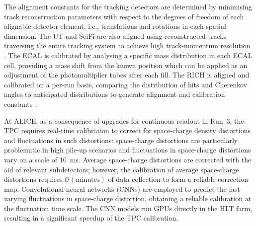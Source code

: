 The alignment constants for the tracking detectors are determined by minimising track reconstruction parameters with respect to the degrees of freedom of each alignable detector element, i.e., translations and rotations in each spatial dimension. The UT and SciFi are also aligned using reconstructed tracks traversing the entire tracking system to achieve high track-momentum resolution \cite{Reiss:2846414}. The ECAL is calibrated by analysing a specific mass distribution in each ECAL cell, providing a mass shift from the known position which can be applied as an adjustment of the photomultiplier tubes after each fill. The RICH is aligned and calibrated on a per-run basis, comparing the distribution of hits and Cherenkov angles to anticipated distributions to generate alignment and calibration constants~\cite{LHCb:RICH_AlignCalib}.

At ALICE, as a consequence of upgrades for continuous readout in Run~3, the TPC requires real-time calibration to correct for space-charge density distortions and fluctuations in such distortions: space-charge distortions are particularly problematic in high pile-up scenarios and fluctuations in space-charge distortions vary on a scale of \SI{10}{\milli\second}. Average space-charge distortions are corrected with the aid of relevant subdetectors; however, the calibration of average space-charge distortions requires $\mathcal{O}\left(\mathrm{minutes}\right)$ of data collection to form a reliable correction map. Convolutional neural networks (CNNs) are employed to predict the fast-varying fluctuations in space-charge distortion, obtaining a reliable calibration at the fluctuation time scale. The CNN models run GPUs directly in the HLT farm, resulting in a significant speedup of the TPC calibration.
